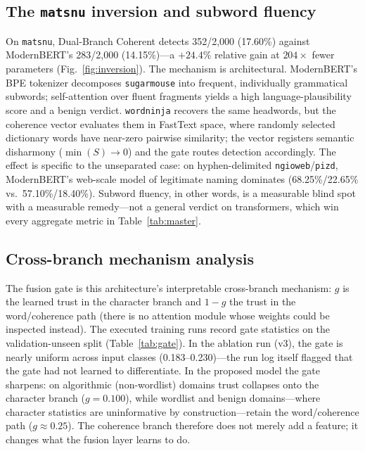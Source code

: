 \documentclass[conference]{IEEEtran}
\begin{document}
\subsection{The \texttt{matsnu} inversion and subword fluency}
\label{sec:inversion}
On \texttt{matsnu}, Dual-Branch Coherent detects 352/2{,}000 (17.60\%) against ModernBERT's 283/2{,}000 (14.15\%)---a $+24.4\%$ relative gain at $204\times$ fewer parameters (Fig.~\ref{fig:inversion}). The mechanism is architectural. ModernBERT's BPE tokenizer decomposes \texttt{sugarmouse} into frequent, individually grammatical subwords; self-attention over fluent fragments yields a high language-plausibility score and a benign verdict. \texttt{wordninja} recovers the same headwords, but the coherence vector evaluates them in FastText space, where randomly selected dictionary words have near-zero pairwise similarity; the vector registers semantic disharmony ($\min(S) \to 0$) and the gate routes detection accordingly. The effect is specific to the unseparated case: on hyphen-delimited \texttt{ngioweb}/\texttt{pizd}, ModernBERT's web-scale model of legitimate naming dominates (68.25\%/22.65\% vs.\ 57.10\%/18.40\%). Subword fluency, in other words, is a measurable blind spot with a measurable remedy---not a general verdict on transformers, which win every aggregate metric in Table~\ref{tab:master}.

\subsection{Cross-branch mechanism analysis}
The fusion gate is this architecture's interpretable cross-branch mechanism: $g$ is the learned trust in the character branch and $1-g$ the trust in the word/coherence path (there is no attention module whose weights could be inspected instead). The executed training runs record gate statistics on the validation-unseen split (Table~\ref{tab:gate}). In the ablation run (v3), the gate is nearly uniform across input classes (0.183--0.230)---the run log itself flagged that the gate had not learned to differentiate. In the proposed model the gate sharpens: on algorithmic (non-wordlist) domains trust collapses onto the character branch ($g = 0.100$), while wordlist and benign domains---where character statistics are uninformative by construction---retain the word/coherence path ($g \approx 0.25$). The coherence branch therefore does not merely add a feature; it changes what the fusion layer learns to do.
\end{document}
